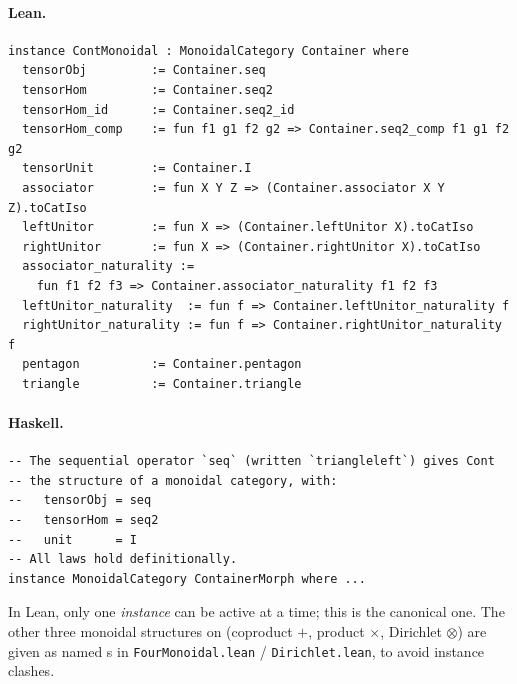 \documentclass[11pt,a4paper]{article}
\begin{document}
\paragraph{Lean.}
\begin{lstlisting}[style=lean]
instance ContMonoidal : MonoidalCategory Container where
  tensorObj         := Container.seq
  tensorHom         := Container.seq2
  tensorHom_id      := Container.seq2_id
  tensorHom_comp    := fun f1 g1 f2 g2 => Container.seq2_comp f1 g1 f2 g2
  tensorUnit        := Container.I
  associator        := fun X Y Z => (Container.associator X Y Z).toCatIso
  leftUnitor        := fun X => (Container.leftUnitor X).toCatIso
  rightUnitor       := fun X => (Container.rightUnitor X).toCatIso
  associator_naturality :=
    fun f1 f2 f3 => Container.associator_naturality f1 f2 f3
  leftUnitor_naturality  := fun f => Container.leftUnitor_naturality f
  rightUnitor_naturality := fun f => Container.rightUnitor_naturality f
  pentagon          := Container.pentagon
  triangle          := Container.triangle
\end{lstlisting}

\paragraph{Haskell.}
\begin{lstlisting}[style=haskell]
-- The sequential operator `seq` (written `triangleleft`) gives Cont
-- the structure of a monoidal category, with:
--   tensorObj = seq
--   tensorHom = seq2
--   unit      = I
-- All laws hold definitionally.
instance MonoidalCategory ContainerMorph where ...
\end{lstlisting}

\begin{fidelitynote}
In Lean, only one  \emph{instance} can be
active at a time; this is the canonical one.  The other three monoidal
structures on  (coproduct $+$, product $\times$, Dirichlet $\otimes$)
are given as named s in \texttt{FourMonoidal.lean} /
\texttt{Dirichlet.lean}, to avoid instance clashes.
\end{fidelitynote}
\end{document}
